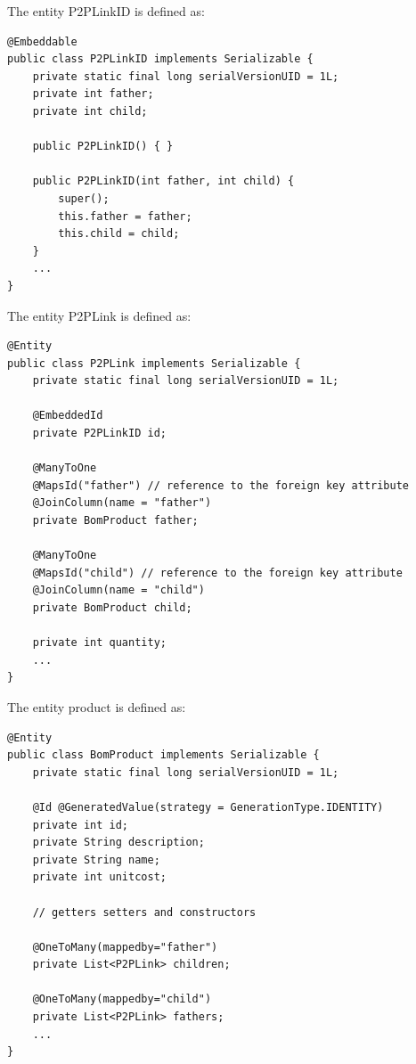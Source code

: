 \documentclass[12pt, a4paper]{report}
\begin{document}
        The entity P2PLinkID is defined as:  
        \begin{lstlisting}[style=Java]
@Embeddable
public class P2PLinkID implements Serializable {
    private static final long serialVersionUID = 1L;
    private int father;
    private int child;

    public P2PLinkID() { }
    
    public P2PLinkID(int father, int child) {
        super();
        this.father = father;
        this.child = child;
    }
    ...
}
        \end{lstlisting}
        The entity P2PLink is defined as:  
        \begin{lstlisting}[style=Java]
@Entity
public class P2PLink implements Serializable {
    private static final long serialVersionUID = 1L;
    
    @EmbeddedId
    private P2PLinkID id;

    @ManyToOne
    @MapsId("father") // reference to the foreign key attribute
    @JoinColumn(name = "father")
    private BomProduct father;

    @ManyToOne
    @MapsId("child") // reference to the foreign key attribute
    @JoinColumn(name = "child")
    private BomProduct child;

    private int quantity;
    ...
}
        \end{lstlisting}
        The entity product is defined as:  
        \begin{lstlisting}[style=Java]
@Entity
public class BomProduct implements Serializable {
    private static final long serialVersionUID = 1L;

    @Id @GeneratedValue(strategy = GenerationType.IDENTITY)
    private int id;
    private String description;
    private String name;
    private int unitcost;

    // getters setters and constructors

    @OneToMany(mappedby="father")
    private List<P2PLink> children;

    @OneToMany(mappedby="child")
    private List<P2PLink> fathers;
    ...
}
        \end{lstlisting}
\end{document}
